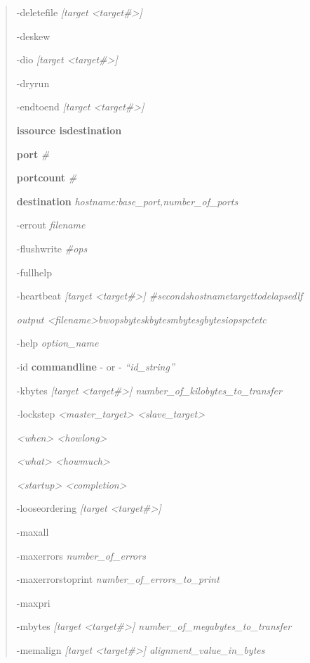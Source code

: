 \begin{quote}
-deletefile \emph{{[}target \textless target\#\textgreater{]}}

-deskew

-dio \emph{{[}target \textless target\#\textgreater{]}}

-dryrun

-endtoend \emph{{[}target \textless target\#\textgreater{]}}

\textbf{issource \textbar{} isdestination}

\textbf{port} \emph{\#}

\textbf{portcount} \emph{\#}

\textbf{destination} \emph{hostname:base\_port,number\_of\_ports}

-errout \emph{filename}

-flushwrite \emph{\#ops}

-fullhelp

-heartbeat \emph{{[}target \textless target\#\textgreater{]} \#seconds\textbar hostname\textbar target\textbar tod\textbar elapsed\textbar lf\textbar{}}

\emph{output \textless filename\textgreater\textbar bw\textbar ops\textbar bytes\textbar kbytes\textbar mbytes\textbar gbytes\textbar iops\textbar pct\textbar etc}

-help \emph{option\_name}

-id \textbf{commandline} - or - \emph{``id\_string''}

-kbytes \emph{{[}target \textless target\#\textgreater{]} number\_of\_kilobytes\_to\_transfer}

\emph{-}lockstep \emph{\textless master\_target\textgreater{} \textless slave\_target\textgreater{}}

\emph{\textless when\textgreater{} \textless howlong\textgreater{}}

\emph{\textless what\textgreater{} \textless howmuch\textgreater{}}

\emph{\textless startup\textgreater{} \textless completion\textgreater{}}

-looseordering \emph{{[}target \textless target\#\textgreater{]}}

-maxall

-maxerrors \emph{number\_of\_errors}

-maxerrorstoprint \emph{number\_of\_errors\_to\_print}

-maxpri

-mbytes \emph{{[}target \textless target\#\textgreater{]} number\_of\_megabytes\_to\_transfer}

-memalign \emph{{[}target \textless target\#\textgreater{]} alignment\_value\_in\_bytes}


\end{quote}
